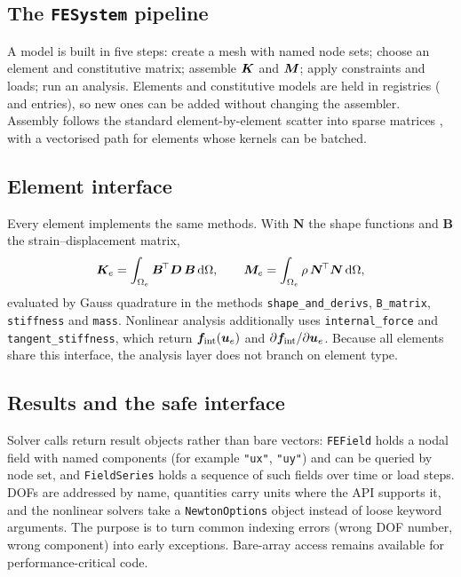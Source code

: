 \subsection{The \texttt{FESystem} pipeline}
A model is built in five steps: create a mesh with named node sets; choose an element and constitutive matrix;
assemble $\bm{K}$ and $\bm{M}$; apply constraints and loads; run an analysis. Elements and constitutive models are held in registries
(\nElements{} and \nConstitutive{} entries), so new ones can be added without changing the assembler.
Assembly follows the standard element-by-element scatter into sparse matrices \cite{zienkiewicz2013fem,bathe2014fep}, with a
vectorised path for elements whose kernels can be batched.

\subsection{Element interface}
Every element implements the same methods. With $\bm N$ the shape functions and $\bm B$ the strain--displacement matrix,
\begin{equation}
  \bm{K}_e=\int_{\Omega_e}\bm B^{\!\top}\bm D\,\bm B\,\mathrm{d}\Omega,\qquad
  \bm{M}_e=\int_{\Omega_e}\rho\,\bm N^{\!\top}\bm N\,\mathrm{d}\Omega,
  \label{eq:elem}
\end{equation}
evaluated by Gauss quadrature in the methods \texttt{shape\_and\_derivs}, \texttt{B\_matrix}, \texttt{stiffness} and \texttt{mass}.
Nonlinear analysis additionally uses \texttt{internal\_force} and \texttt{tangent\_stiffness}, which return $\bm f_{\mathrm{int}}(\bm{u}_e)$
and $\partial\bm f_{\mathrm{int}}/\partial\bm{u}_e$. Because all elements share this interface, the analysis layer does not branch on element type.

\subsection{Results and the safe interface}
Solver calls return result objects rather than bare vectors: \texttt{FEField} holds a nodal field with named components (for example
\texttt{"ux"}, \texttt{"uy"}) and can be queried by node set, and \texttt{FieldSeries} holds a sequence of such fields over time or load steps.
DOFs are addressed by name, quantities carry units where the API supports it, and the nonlinear solvers take a \texttt{NewtonOptions}
object instead of loose keyword arguments. The purpose is to turn common indexing errors (wrong DOF number, wrong component) into early
exceptions. Bare-array access remains available for performance-critical code.

